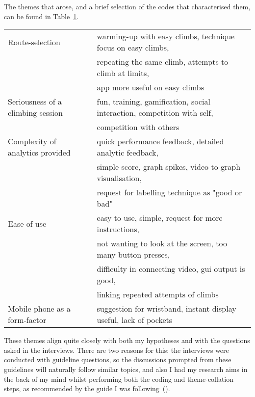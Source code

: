 The themes that arose, and a brief selection of the codes that characterised them, can be found in Table~\ref{tab:themes}.

\begin{table}[h]
\begin{tabular}{|l|l|}
\hline
Route-selection     & 
warming-up with easy climbs, technique focus on easy climbs,
\\& repeating the same climb, attempts to climb at limits, 
\\& app more useful on easy climbs
\\ \hline

Seriousness of a climbing session   &  
fun, training, gamification, social interaction, competition with self,
\\& competition with others
\\ \hline

Complexity of analytics provided    & 
quick performance feedback, detailed analytic feedback,
\\& simple score, graph spikes, video to graph visualisation,
\\& request for labelling technique as "good or bad"
\\ \hline

Ease of use                   & 
easy to use, simple, request for more instructions, 
\\& not wanting to look at the screen, too many button presses,
\\& difficulty in connecting video, gui output is good,
\\& linking repeated attempts of climbs
\\ \hline

Mobile phone as a form-factor       & 
suggestion for wristband, instant display useful, lack of pockets
\\ \hline

\end{tabular}
\label{tab:themes}
\end{table}

These themes align quite closely with both my hypotheses and with the questions asked in the interviews.
There are two reasons for this: the interviews were conducted with guideline questions, so the discussions prompted from these guidelines will naturally follow similar topics, and also I had my research aims in the back of my mind whilst performing both the coding and theme-collation steps, as recommended by the guide I was following~(\cite{brauminterviewta}).


